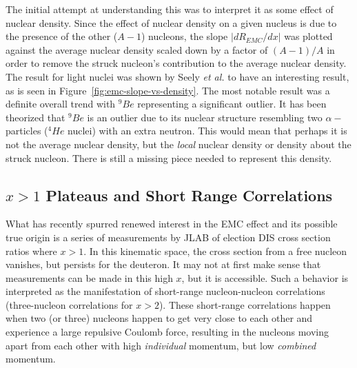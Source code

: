 The initial attempt at understanding this was to interpret it as some effect of nuclear density. Since the effect of nuclear density on a given nucleus is due to the presence of the other ($A-1$) nucleons, the slope $|dR_{EMC}/dx|$ was plotted against the average nuclear density scaled down by a factor of $(A-1)/A$ in order to remove the struck nucleon’s contribution to the average nuclear density. The result for light nuclei was shown by Seely \emph{et al.} to have an interesting result, as is seen in Figure~\ref{fig:emc-slope-vs-density}. The most notable result was a definite overall trend with $^9Be$ representing a significant outlier. It has been theorized that $^9Be$ is an outlier due to its nuclear structure resembling two $\alpha-$particles ($^4He$ nuclei) with an extra neutron. This would mean that perhaps it is not the average nuclear density, but the \emph{local} nuclear density or density about the struck nucleon. There is still a missing piece needed to represent this density.

\subsection{$x>1$ Plateaus and Short Range Correlations}

What has recently spurred renewed interest in the EMC effect and its possible true origin is a series of measurements by JLAB of election DIS cross section ratios where $x>1$. In this kinematic space, the cross section from a free nucleon vanishes, but persists for the deuteron. It may not at first make sense that measurements can be made in this high $x$, but it is accessible. Such a behavior is interpreted as the manifestation of short-range nucleon-nucleon correlations (three-nucleon correlations for $x>2$). These short-range correlations happen when two (or three) nucleons happen to get very close to each other and experience a large repulsive Coulomb force, resulting in the nucleons moving apart from each other with high \emph{individual} momentum, but low \emph{combined} momentum.


